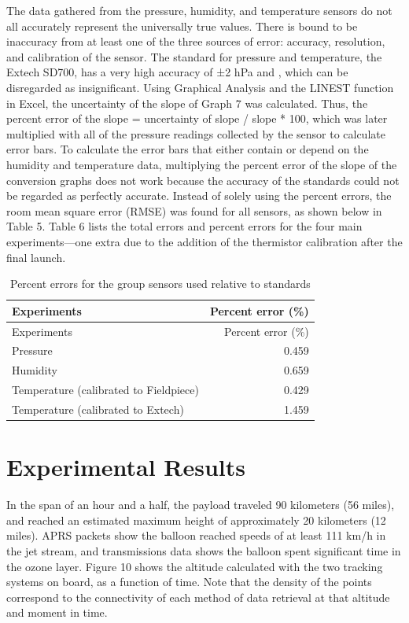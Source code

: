 \documentclass[12pt,]{article}
\begin{document}
The data gathered from the pressure, humidity, and temperature sensors
do not all accurately represent the universally true values. There is
bound to be inaccuracy from at least one of the three sources of error:
accuracy, resolution, and calibration of the sensor. The standard for
pressure and temperature, the Extech SD700, has a very high accuracy of
±2 hPa and , which can be disregarded as insignificant. Using Graphical
Analysis and the LINEST function in Excel, the uncertainty of the slope
of Graph 7 was calculated. Thus, the percent error of the slope =
uncertainty of slope / slope * 100, which was later multiplied with all
of the pressure readings collected by the sensor to calculate error
bars. To calculate the error bars that either contain or depend on the
humidity and temperature data, multiplying the percent error of the
slope of the conversion graphs does not work because the accuracy of the
standards could not be regarded as perfectly accurate. Instead of solely
using the percent errors, the room mean square error (RMSE) was found
for all sensors, as shown below in Table 5. Table 6 lists the total
errors and percent errors for the four main experiments---one extra due
to the addition of the thermistor calibration after the final launch.

\begin{longtable}[]{@{}lr@{}}
\caption{Percent errors for the group sensors used relative to
standards}\tabularnewline
\toprule
Experiments & Percent error (\%)\tabularnewline
\midrule
\endfirsthead
\toprule
Experiments & Percent error (\%)\tabularnewline
\midrule
\endhead
Pressure & 0.459\tabularnewline
Humidity & 0.659\tabularnewline
Temperature (calibrated to Fieldpiece) & 0.429\tabularnewline
Temperature (calibrated to Extech) & 1.459\tabularnewline
\bottomrule
\end{longtable}

\section{Experimental Results}\label{experimental-results}

In the span of an hour and a half, the payload traveled 90 kilometers
(56 miles), and reached an estimated maximum height of approximately 20
kilometers (12 miles). APRS packets show the balloon reached speeds of
at least 111 km/h in the jet stream, and transmissions data shows the
balloon spent significant time in the ozone layer. Figure 10 shows the
altitude calculated with the two tracking systems on board, as a
function of time. Note that the density of the points correspond to the
connectivity of each method of data retrieval at that altitude and
moment in time.
\end{document}
